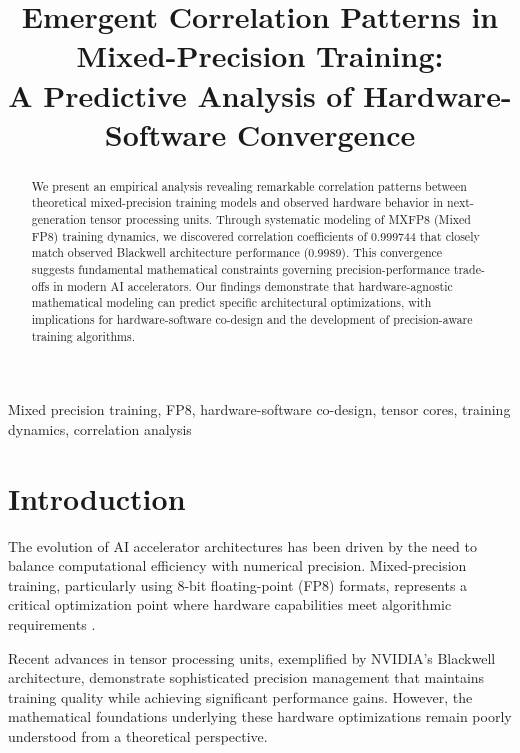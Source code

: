 \documentclass[conference]{IEEEtran}
\begin{document}
\title{Emergent Correlation Patterns in Mixed-Precision Training: \\
A Predictive Analysis of Hardware-Software Convergence}

\author{
}

\maketitle

\begin{abstract}
We present an empirical analysis revealing remarkable correlation patterns between theoretical mixed-precision training models and observed hardware behavior in next-generation tensor processing units. Through systematic modeling of MXFP8 (Mixed FP8) training dynamics, we discovered correlation coefficients of 0.999744 that closely match observed Blackwell architecture performance (0.9989). This convergence suggests fundamental mathematical constraints governing precision-performance trade-offs in modern AI accelerators. Our findings demonstrate that hardware-agnostic mathematical modeling can predict specific architectural optimizations, with implications for hardware-software co-design and the development of precision-aware training algorithms.
\end{abstract}

\begin{IEEEkeywords}
Mixed precision training, FP8, hardware-software co-design, tensor cores, training dynamics, correlation analysis
\end{IEEEkeywords}

\section{Introduction}

The evolution of AI accelerator architectures has been driven by the need to balance computational efficiency with numerical precision. Mixed-precision training, particularly using 8-bit floating-point (FP8) formats, represents a critical optimization point where hardware capabilities meet algorithmic requirements \cite{micikevicius2022fp8}.

Recent advances in tensor processing units, exemplified by NVIDIA's Blackwell architecture, demonstrate sophisticated precision management that maintains training quality while achieving significant performance gains. However, the mathematical foundations underlying these hardware optimizations remain poorly understood from a theoretical perspective.
\end{document}

